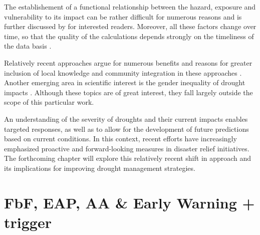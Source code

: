 {The establishement of a functional relationship between the hazard, exposure and vulnerability to its impact can be rather difficult for numerous reasons and is further discussed by \autocite{boultDroughtImpactbasedForecasting2022} for interested readers. Moreover, all these factors change over time, so that the quality of the calculations depends strongly on the timeliness of the data basis \autocite{harrowsmithFutureForecastImpact2020}. 

Relatively recent approaches argue for numerous benefits and reasons for greater inclusion of local knowledge and community integration in these approaches \autocite{balehegnIndigenousWeatherClimate2019,dubeFrameworkIntegrationTraditional2016,ebhuomaFrameworkIntegratingScientific2020,giordanoIntegrationLocalScientific2013a,greyIntegratingLocalIndigenous2020,hermansExploringIntegrationLocal2022a,mercerCultureDisasterRisk2012,mutasaKnowledgeApartheidDisaster2015,nyetanyaneIntegrationIndigenousKnowledge2020,nyongValueIndigenousKnowledge2007}. Another emerging area in scientific interest is the gender inequality of drought impacts \autocite{acharyaWhenRiverTalks2019,fanningDroughtDisplacementLivelihoods2018,hiwasakiLocalIndigenousKnowledge2015,mustafaGenderingFloodEarly2015,sachsRoutledgeHandbookGender2020,saniGenderOtherVulnerabilities2022}. Although these topics are of great interest, they fall largely outside the scope of this particular work.

An understanding of the severity of droughts and their current impacts enables targeted responses, as well as to allow for the development of future predictions based on current conditions. In this context, recent efforts have increasingly emphasized proactive and forward-looking measures in disaster relief initiatives. The forthcoming chapter will explore this relatively recent shift in approach and its implications for improving drought management strategies.


\section{FbF, EAP, AA & Early Warning + trigger}

}
